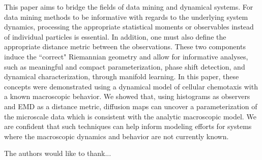 \documentclass[prl, reprint]{revtex4-1}
\begin{document}
This paper aims to bridge the fields of data mining and dynamical systems. 
%
For data mining methods to be informative with regards to the underlying system dynamics, processing the appropriate statistical moments or observables instead of individual particles is essential. 
%
In addition, one must also define the appropriate distance metric between the observations.
%
These two components induce the ``correct" Riemannian geometry and allow for informative analyses, such as meaningful and compact parameterization, phase shift detection, and dynamical characterization, through manifold learning.
%
In this paper, these concepts were demonstrated using a dynamical model of cellular chemotaxis with a known macroscopic behavior.
%
We showed that, using histograms as observers and EMD as a distance metric, diffusion maps can uncover a parameterization of the microscale data which is consistent with the analytic macroscopic model.
%
We are confident that such techniques can help inform modeling efforts for systems where the macroscopic dynamics and behavior are not currently known. 




\begin{acknowledgments}

The authors would like to thank...

\end{acknowledgments}




\end{document}

